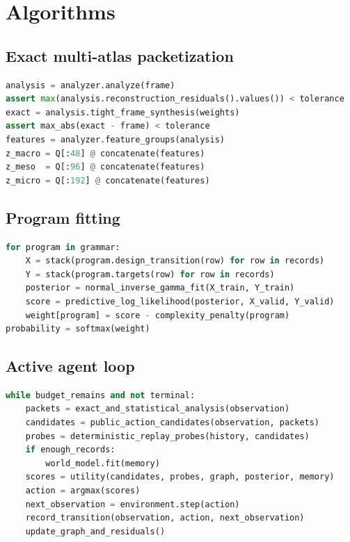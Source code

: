 \documentclass[11pt]{article}
\theoremstyle{remark}
\begin{document}
\section{Algorithms}

\subsection{Exact multi-atlas packetization}

\begin{lstlisting}[language=Python,caption={Core exact analysis contract.}]
analysis = analyzer.analyze(frame)
assert max(analysis.reconstruction_residuals().values()) < tolerance
exact = analysis.tight_frame_synthesis(weights)
assert max_abs(exact - frame) < tolerance
features = analyzer.feature_groups(analysis)
z_macro = Q[:48] @ concatenate(features)
z_meso  = Q[:96] @ concatenate(features)
z_micro = Q[:192] @ concatenate(features)
\end{lstlisting}

\subsection{Program fitting}

\begin{lstlisting}[language=Python,caption={Typed Bayesian program comparison.}]
for program in grammar:
    X = stack(program.design_transition(row) for row in records)
    Y = stack(program.targets(row) for row in records)
    posterior = normal_inverse_gamma_fit(X_train, Y_train)
    score = predictive_log_likelihood(posterior, X_valid, Y_valid)
    weight[program] = score - complexity_penalty(program)
probability = softmax(weight)
\end{lstlisting}

\clearpage
\subsection{Active agent loop}

\begin{lstlisting}[language=Python,caption={PR-LASM planning loop.}]
while budget_remains and not terminal:
    packets = exact_and_statistical_analysis(observation)
    candidates = public_action_candidates(observation, packets)
    probes = deterministic_replay_probes(history, candidates)
    if enough_records:
        world_model.fit(memory)
    scores = utility(candidates, probes, graph, posterior, memory)
    action = argmax(scores)
    next_observation = environment.step(action)
    record_transition(observation, action, next_observation)
    update_graph_and_residuals()
\end{lstlisting}
\end{document}
